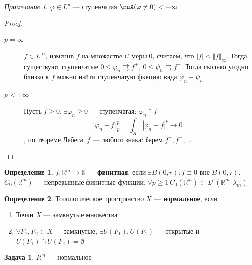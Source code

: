 \documentclass[english]{article}
\newcommand{\R}{\mathbb{R}}
\theoremstyle{plain}
\theoremstyle{remark}
\newtheorem*{remark}{Примечание}
\theoremstyle{definition}
\newtheorem{task}{Задача}
\newtheorem*{definition}{Определение}
\begin{document}
\begin{remark}
\(\varphi \in L^p\) --- ступенчатая \implies \(\muX(\varphi \neq 0) < +\infty\)
\end{remark}
\begin{proof}
\-
\begin{description}
\item[{\(p = \infty\)}] \(f \in L^\infty\), изменив \(f\) на множестве \(C\) меры \(0\), считаем, что \(|f| \le \Vert f \Vert_\infty\). Тогда существуют ступенчатые \(0\le\varphi_n \rightrightarrows f^+\), \(0 \le \psi_n \rightrightarrows f^-\). Тогда сколько угодно близко к \(f\) можно найти ступенчатую фкнцию вида \(\varphi_n + \psi_n\)
\item[{\(p < +\infty\)}] Пусть \(f \ge 0\). \(\exists \varphi_n \ge 0\) --- ступенчатая: \(\varphi_n \uparrow f\)
\[ \Vert \varphi_n - f \Vert^p_p = \int_X | \varphi_n - f |^p \to 0 \]
, по теореме Лебега. \(f\) --- любого знака: берем \(f^+, f^-, \dots\)
\end{description}
\end{proof}
\begin{definition}
\(f: \R^m \to \R\) --- \textbf{финитная}, если \(\exists B(0, r): f\equiv 0\) вне \(B(0, r)\). \\
\(C_0(\R^m)\) --- непрерывные финитные функции. \(\forall p \ge 1\ C_0(\R^m) \subset L^p(\R^m, \lambda_m)\)
\end{definition}
\begin{definition}
Топологическое пространство \(X\) --- \textbf{нормальное}, если
\begin{enumerate}
\item Точки \(X\) --- замкнутые множества
\item \(\forall F_1, F_2 \subset X\) --- замкнутые, \(\exists U(F_1), U(F_2)\) --- открытые и \(U(F_1)\cap U(F_2) = \emptyset\)
\end{enumerate}
\end{definition}
\begin{task}
\(R^m\) --- нормальное
\end{task}
\end{document}
